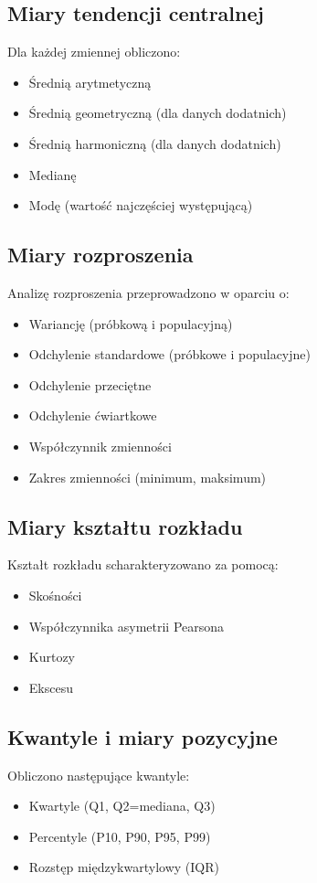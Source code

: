 \documentclass[12pt,a4paper]{article}
\begin{document}
\subsection{Miary tendencji centralnej}
Dla każdej zmiennej obliczono:
\begin{itemize}
    \item Średnią arytmetyczną
    \item Średnią geometryczną (dla danych dodatnich)
    \item Średnią harmoniczną (dla danych dodatnich)
    \item Medianę
    \item Modę (wartość najczęściej występującą)
\end{itemize}

\subsection{Miary rozproszenia}
Analizę rozproszenia przeprowadzono w oparciu o:
\begin{itemize}
    \item Wariancję (próbkową i populacyjną)
    \item Odchylenie standardowe (próbkowe i populacyjne)
    \item Odchylenie przeciętne
    \item Odchylenie ćwiartkowe
    \item Współczynnik zmienności
    \item Zakres zmienności (minimum, maksimum)
\end{itemize}

\subsection{Miary kształtu rozkładu}
Kształt rozkładu scharakteryzowano za pomocą:
\begin{itemize}
    \item Skośności
    \item Współczynnika asymetrii Pearsona
    \item Kurtozy
    \item Ekscesu
\end{itemize}

\subsection{Kwantyle i miary pozycyjne}
Obliczono następujące kwantyle:
\begin{itemize}
    \item Kwartyle (Q1, Q2=mediana, Q3)
    \item Percentyle (P10, P90, P95, P99)
    \item Rozstęp międzykwartylowy (IQR)
\end{itemize}
\end{document}
